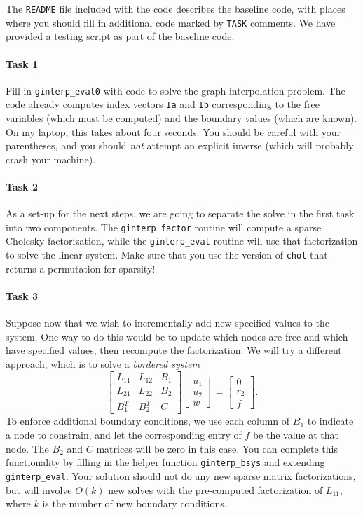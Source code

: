 \documentclass[12pt, leqno]{article}
\begin{document}
The {\tt README} file included with the code describes the baseline
code, with places where you should fill in additional code marked by
{\tt TASK} comments.  We have provided a testing script as part of the
baseline code.

\paragraph*{Task 1}
Fill in {\tt ginterp\_eval0} with code to solve the
graph interpolation problem.  The code already computes index vectors
{\tt Ia} and {\tt Ib} corresponding to the free variables (which
must be computed) and the boundary values (which are known).  On
my laptop, this takes about four seconds.  You should be careful with
your parentheses, and you should {\em not} attempt an explicit inverse
(which will probably crash your machine).

\paragraph*{Task 2}
As a set-up for the next steps, we are going to separate the solve
in the first task into two components.  The {\tt ginterp\_factor}
routine will compute a sparse Cholesky factorization, while the
{\tt ginterp\_eval} routine will use that factorization to solve
the linear system.  Make sure that you use the version of {\tt chol}
that returns a permutation for sparsity!

\paragraph*{Task 3}
Suppose now that we wish to incrementally add new specified values
to the system.  One way to do this would be to update which nodes
are free and which have specified values, then recompute the
factorization.  We will try a different approach, which is to solve
a {\em bordered system}
\[
  \begin{bmatrix}
    L_{11} & L_{12} & B_1 \\
    L_{21} & L_{22} & B_2 \\
    B_1^T & B_2^T & C
  \end{bmatrix}
  \begin{bmatrix}
    u_1 \\ u_2 \\ w
  \end{bmatrix} =
  \begin{bmatrix}
    0 \\ r_2 \\ f
  \end{bmatrix}.
\]
To enforce additional boundary conditions, we use each column of $B_1$
to indicate a node to constrain, and let the corresponding entry of $f$
be the value at that node.  The $B_2$ and $C$ matrices will be zero
in this case.  You can complete this functionality by filling in the
helper function {\tt ginterp\_bsys} and extending {\tt ginterp\_eval}.
Your solution should not do any new sparse matrix factorizations, but
will involve $O(k)$ new solves with the pre-computed factorization of
$L_{11}$, where $k$ is the number of new boundary conditions.
\end{document}
